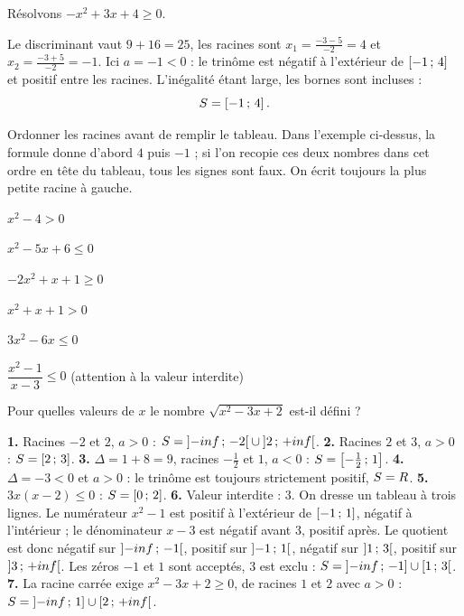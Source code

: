 \begin{exemple}
Résolvons $-x^{2}+3x+4 \geq 0$.

Le discriminant vaut $9+16 = 25$, les racines sont
$x_{1} = \frac{-3-5}{-2} = 4$ et $x_{2} = \frac{-3+5}{-2} = -1$. Ici
$a = -1 < 0$ : le trinôme est négatif à l'extérieur de $\left[-1\,;\,4\right]$
et positif entre les racines. L'inégalité étant large, les bornes sont
incluses :
\[
  S = \left[-1\,;\,4\right].
\]
\end{exemple}

\begin{erreurclassique}
Ordonner les racines avant de remplir le tableau. Dans l'exemple ci-dessus,
la formule donne d'abord $4$ puis $-1$ ; si l'on recopie ces deux nombres
dans cet ordre en tête du tableau, tous les signes sont faux. On écrit
toujours la plus petite racine à gauche.
\end{erreurclassique}

\begin{entrainement}[inéquations]
\exo[\niveau{1}] $x^{2}-4 > 0$

\exo[\niveau{1}] $x^{2}-5x+6 \leq 0$

\exo[\niveau{2}] $-2x^{2}+x+1 \geq 0$

\exo[\niveau{2}] $x^{2}+x+1 > 0$

\exo[\niveau{2}] $3x^{2}-6x \leq 0$

\exo[\niveau{3}] $\dfrac{x^{2}-1}{x-3} \leq 0$ \quad (attention à la valeur
interdite)

\exo[\niveau{3}] Pour quelles valeurs de $x$ le nombre $\sqrt{x^{2}-3x+2}$
est-il défini ?
\end{entrainement}

\begin{corrige}[inéquations]
\textbf{1.} Racines $-2$ et $2$, $a>0$ :
$S = \left]-inf\,;\,-2\right[\cup\left]2\,;\,+inf\right[$.
\textbf{2.} Racines $2$ et $3$, $a>0$ : $S = \left[2\,;\,3\right]$.
\textbf{3.} $\Delta = 1+8 = 9$, racines $-\frac12$ et $1$, $a<0$ :
$S = \left[-\frac12\,;\,1\right]$.
\textbf{4.} $\Delta = -3<0$ et $a>0$ : le trinôme est toujours strictement
positif, $S = R$.
\textbf{5.} $3x(x-2) \leq 0$ : $S = \left[0\,;\,2\right]$.
\textbf{6.} Valeur interdite : $3$. On dresse un tableau à trois lignes. Le
numérateur $x^{2}-1$ est positif à l'extérieur de $\left[-1\,;\,1\right]$,
négatif à l'intérieur ; le dénominateur $x-3$ est négatif avant $3$, positif
après. Le quotient est donc négatif sur $\left]-inf\,;\,-1\right[$, positif
sur $\left]-1\,;\,1\right[$, négatif sur $\left]1\,;\,3\right[$, positif sur
$\left]3\,;\,+inf\right[$. Les zéros $-1$ et $1$ sont acceptés,
$3$ est exclu :
$S = \left]-inf\,;\,-1\right]\cup\left[1\,;\,3\right[$.
\textbf{7.} La racine carrée exige $x^{2}-3x+2 \geq 0$, de racines $1$ et
$2$ avec $a>0$ :
$S = \left]-inf\,;\,1\right]\cup\left[2\,;\,+inf\right[$.
\end{corrige}

